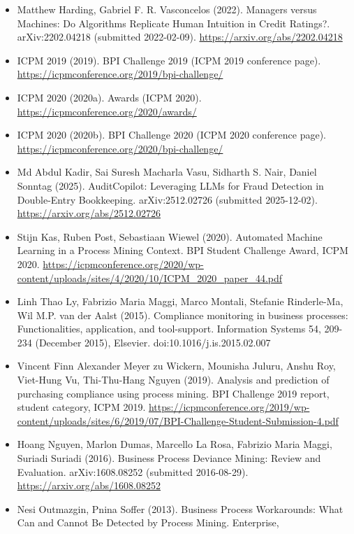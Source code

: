 \documentclass[
  10pt,
]{article}
\begin{document}
\begin{itemize}
  \url{https://icpmconference.org/2019/wp-content/uploads/sites/6/2019/07/BPI-Challenge-Submission-6.pdf}
\item
  Matthew Harding, Gabriel F. R. Vasconcelos (2022). Managers versus
  Machines: Do Algorithms Replicate Human Intuition in Credit Ratings?.
  arXiv:2202.04218 (submitted 2022-02-09).
  \url{https://arxiv.org/abs/2202.04218}
\item
  ICPM 2019 (2019). BPI Challenge 2019 (ICPM 2019 conference page).
  \url{https://icpmconference.org/2019/bpi-challenge/}
\item
  ICPM 2020 (2020a). Awards (ICPM 2020).
  \url{https://icpmconference.org/2020/awards/}
\item
  ICPM 2020 (2020b). BPI Challenge 2020 (ICPM 2020 conference page).
  \url{https://icpmconference.org/2020/bpi-challenge/}
\item
  Md Abdul Kadir, Sai Suresh Macharla Vasu, Sidharth S. Nair, Daniel
  Sonntag (2025). AuditCopilot: Leveraging LLMs for Fraud Detection in
  Double-Entry Bookkeeping. arXiv:2512.02726 (submitted 2025-12-02).
  \url{https://arxiv.org/abs/2512.02726}
\item
  Stijn Kas, Ruben Post, Sebastiaan Wiewel (2020). Automated Machine
  Learning in a Process Mining Context. BPI Student Challenge Award,
  ICPM 2020.
  \url{https://icpmconference.org/2020/wp-content/uploads/sites/4/2020/10/ICPM\_2020\_paper\_44.pdf}
\item
  Linh Thao Ly, Fabrizio Maria Maggi, Marco Montali, Stefanie
  Rinderle-Ma, Wil M.P. van der Aalst (2015). Compliance monitoring in
  business processes: Functionalities, application, and tool-support.
  Information Systems 54, 209-234 (December 2015), Elsevier.
  doi:10.1016/j.is.2015.02.007
\item
  Vincent Finn Alexander Meyer zu Wickern, Mounisha Juluru, Anshu Roy,
  Viet-Hung Vu, Thi-Thu-Hang Nguyen (2019). Analysis and prediction of
  purchasing compliance using process mining. BPI Challenge 2019 report,
  student category, ICPM 2019.
  \url{https://icpmconference.org/2019/wp-content/uploads/sites/6/2019/07/BPI-Challenge-Student-Submission-4.pdf}
\item
  Hoang Nguyen, Marlon Dumas, Marcello La Rosa, Fabrizio Maria Maggi,
  Suriadi Suriadi (2016). Business Process Deviance Mining: Review and
  Evaluation. arXiv:1608.08252 (submitted 2016-08-29).
  \url{https://arxiv.org/abs/1608.08252}
\item
  Nesi Outmazgin, Pnina Soffer (2013). Business Process Workarounds:
  What Can and Cannot Be Detected by Process Mining. Enterprise,

\end{itemize}
\end{document}
